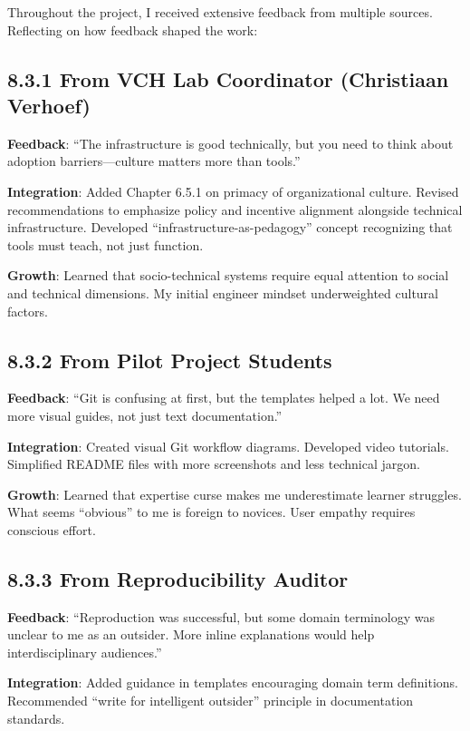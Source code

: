 \documentclass[
  oneside,
  open=any]{scrbook}
\begin{document}
Throughout the project, I received extensive feedback from multiple
sources. Reflecting on how feedback shaped the work:

\subsection{8.3.1 From VCH Lab Coordinator (Christiaan
Verhoef)}\label{from-vch-lab-coordinator-christiaan-verhoef}

\textbf{Feedback}: ``The infrastructure is good technically, but you
need to think about adoption barriers---culture matters more than
tools.''

\textbf{Integration}: Added Chapter 6.5.1 on primacy of organizational
culture. Revised recommendations to emphasize policy and incentive
alignment alongside technical infrastructure. Developed
``infrastructure-as-pedagogy'' concept recognizing that tools must
teach, not just function.

\textbf{Growth}: Learned that socio-technical systems require equal
attention to social and technical dimensions. My initial engineer
mindset underweighted cultural factors.

\subsection{8.3.2 From Pilot Project
Students}\label{from-pilot-project-students}

\textbf{Feedback}: ``Git is confusing at first, but the templates helped
a lot. We need more visual guides, not just text documentation.''

\textbf{Integration}: Created visual Git workflow diagrams. Developed
video tutorials. Simplified README files with more screenshots and less
technical jargon.

\textbf{Growth}: Learned that expertise curse makes me underestimate
learner struggles. What seems ``obvious'' to me is foreign to novices.
User empathy requires conscious effort.

\subsection{8.3.3 From Reproducibility
Auditor}\label{from-reproducibility-auditor}

\textbf{Feedback}: ``Reproduction was successful, but some domain
terminology was unclear to me as an outsider. More inline explanations
would help interdisciplinary audiences.''

\textbf{Integration}: Added guidance in templates encouraging domain
term definitions. Recommended ``write for intelligent outsider''
principle in documentation standards.
\end{document}
